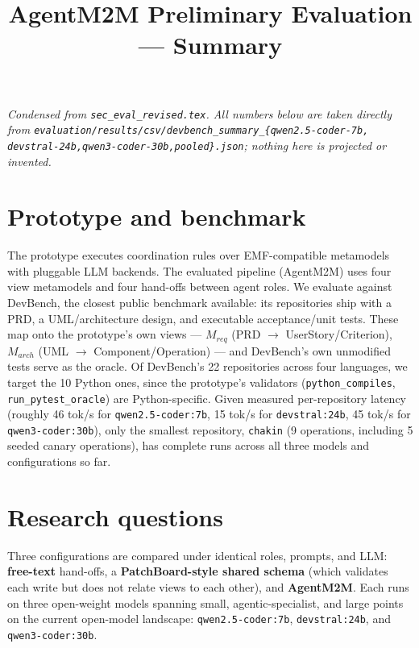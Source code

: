 \documentclass[11pt]{article}
\title{AgentM2M Preliminary Evaluation --- Summary}
\author{}
\date{}
\newcommand{\tool}{AgentM2M}
\begin{document}
\maketitle

\noindent\textit{Condensed from \texttt{sec\_eval\_revised.tex}. All
numbers below are taken directly from
\texttt{evaluation/results/csv/devbench\_summary\_\{qwen2.5-coder-7b,
devstral-24b,qwen3-coder-30b,pooled\}.json}; nothing here is projected or
invented.}

\section*{Prototype and benchmark}

The prototype executes coordination rules over EMF-compatible metamodels
with pluggable LLM backends. The evaluated pipeline (\tool{}) uses four
view metamodels and four hand-offs between agent roles. We evaluate
against DevBench, the closest public benchmark available: its
repositories ship with a PRD, a UML/architecture design, and executable
acceptance/unit tests. These map onto the prototype's own views ---
$M_{\mathit{req}}$ (PRD $\to$ UserStory/Criterion), $M_{\mathit{arch}}$
(UML $\to$ Component/Operation) --- and DevBench's own unmodified tests
serve as the oracle. Of DevBench's 22 repositories across four languages,
we target the 10 Python ones, since the prototype's validators
(\texttt{python\_compiles}, \texttt{run\_pytest\_oracle}) are
Python-specific. Given measured per-repository latency (roughly 46 tok/s
for \texttt{qwen2.5-coder:7b}, 15 tok/s for \texttt{devstral:24b}, 45
tok/s for \texttt{qwen3-coder:30b}), only the smallest repository,
\texttt{chakin} (9 operations, including 5 seeded canary operations), has
complete runs across all three models and configurations so far.

\section*{Research questions}

Three configurations are compared under identical roles, prompts, and
LLM: \textbf{free-text} hand-offs, a \textbf{PatchBoard-style shared
schema} (which validates each write but does not relate views to each
other), and \textbf{\tool{}}. Each runs on three open-weight models
spanning small, agentic-specialist, and large points on the current
open-model landscape: \texttt{qwen2.5-coder:7b}, \texttt{devstral:24b},
and \texttt{qwen3-coder:30b}.
\end{document}
